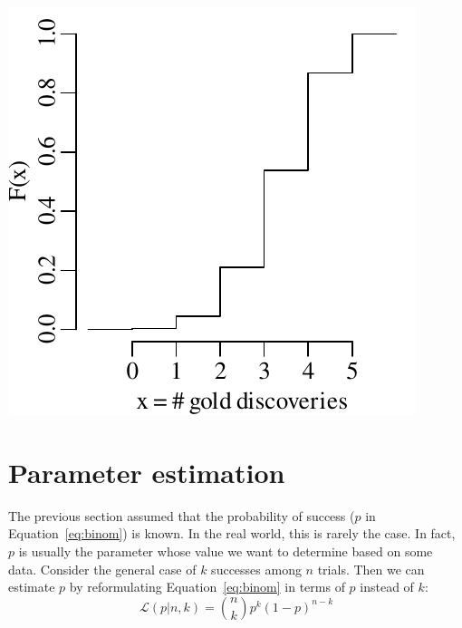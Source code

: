\noindent\begin{minipage}[t][][b]{.3\textwidth}
  \includegraphics[]{../figures/goldCDF.pdf}
\end{minipage}
\begin{minipage}[t][][t]{.7\textwidth}
  \label{fig:goldCDF}
\end{minipage}

\section{Parameter estimation}
\label{sec:binompar}

The previous section assumed that the probability of success ($p$ in
Equation~\ref{eq:binom}) is known.  In the real world, this is rarely
the case. In fact, $p$ is usually the parameter whose value we want to
determine based on some data. Consider the general case of $k$
successes among $n$ trials. Then we can estimate $p$ by reformulating
Equation~\ref{eq:binom} in terms of $p$ instead of $k$:
\begin{equation}
  \mathcal{L}(p|n,k) = \binom{n}{k} p^k (1-p)^{n-k}
  \label{eq:Lbinom}
\end{equation}

